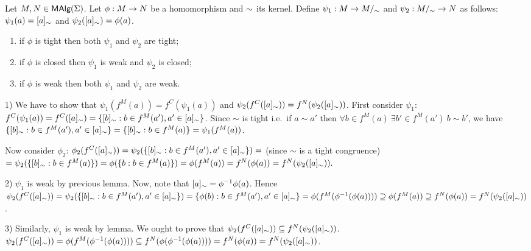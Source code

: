 \documentclass[10pt]{article}
\begin{document}
\begin{Theorem}
\label{th:epimono}
Let $M,N \in \mbox{\rm\sf MAlg}(\Sigma)$.  Let $\phi: M \rightarrow N$ be a homomorphism and
$\sim$ its kernel. Define $\psi_1: M \rightarrow M/_\sim$ and $\psi_2:
M/_\sim \rightarrow N$ as follows: $\psi_1(a) = [a]_\sim$ and
$\psi_2([a]_\sim) = \phi(a)$.
\begin{enumerate}\MyLPar
\item{if $\phi$ is tight then both $\psi_1$ and $\psi_2$ are tight;}
\item{if $\phi$ is closed then $\psi_1$ is weak and $\psi_2$ is closed;}
\item{if $\phi$ is weak then both $\psi_1$ and $\psi_2$ are weak.}
\end{enumerate}
\end{Theorem}

\begin{Proof}
1) We have to show that $\psi_1(f^M(a)) = f^C(\psi_1(a))$ and
$\psi_2(f^C([a]_\sim)) = f^N(\psi_2([a]_\sim))$. First consider
$\psi_1$: $f^C(\psi_1(a)) = f^C([a]_\sim) = \{[b]_\sim : b \in
f^M(a'), a' \in [a]_\sim\}$.  Since $\sim$ is tight i.e.\ if $a \sim
a'$ then $\forall {b \in f^M(a)}\ \exists {b' \in f^M(a')}\ b \sim
b'$, we have $\{[b]_\sim : b \in f^M(a'), a' \in [a]_\sim\} =
\{[b]_\sim : b \in f^M(a)\} = \psi_1(f^M(a))$.

Now consider $\phi_2$: $\phi_2(f^C([a]_\sim)) = \psi_2(\{[b]_\sim
: b \in f^M(a'), a' \in [a]_\sim\}) =$ (since $\sim$ is a tight
congruence) $= \psi_2(\{[b]_\sim : b \in f^M(a)\}) = \phi(\{b: b \in
f^M(a)\}) = \phi(f^M(a)) = f^N(\phi(a)) = f^N(\psi_2([a]_\sim)).$

2) $\psi_1$ is weak by previous lemma. Now, note that $[a]_\sim =
\phi^{-1}\phi(a)$. Hence $\psi_2(f^C([a]_\sim)) =
\psi_2(\{[b]_\sim : b \in f^M(a'), a' \in [a]_\sim\}) = \{\phi(b):
b \in f^M(a'), a' \in [a]_\sim\} = \phi(f^M(\phi^{-1}(\phi(a))))
\supseteq \phi(f^M(a)) \supseteq f^N(\phi(a)) =
f^N(\psi_2([a]_\sim))$.

3) Similarly, $\psi_1$ is weak by lemma. We ought to prove that
$\psi_2(f^C([a]_\sim)) \subseteq f^N(\psi_2([a]_\sim))$.
$\psi_2(f^C([a]_\sim)) = \phi(f^M(\phi^{-1}(\phi(a)))) \subseteq
f^N(\phi(\phi^{-1}(\phi(a)))) = f^N(\phi(a)) =
f^N(\psi_2([a]_\sim))$.
\end{Proof}
\end{document}
